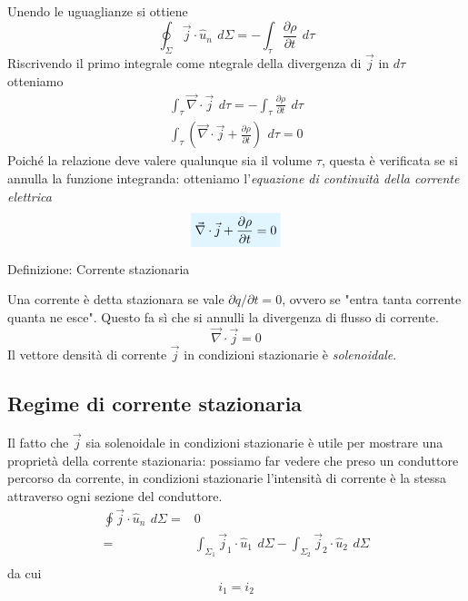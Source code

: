 \documentclass[x11names]{report}
\newcommand{\definizione}[2]{
	\begin{center}
		\fboxsep11pt
		\colorbox{myblue}{\begin{minipage}{5.75in}
				\begin{blues}{Definizione: #1}
					#2
				\end{blues}
		\end{minipage}}
	\end{center}
}
\newcommand{\viola}[1]{%
	\colorbox{myblue}{$\displaystyle #1$}
}
\begin{document}
Unendo le uguaglianze si ottiene
\[
\oint_{\Sigma} \vec{j}\cdot \hat{u}_n \,\ d\Sigma = -\int_\tau \frac{\partial\rho}{\partial t} \,\ d\tau
\]
Riscrivendo il primo integrale come ntegrale della divergenza di \(\vec{j}\) in \(d\tau\) otteniamo
\begin{gather}
	\int_\tau \vec{\nabla} \cdot \vec{j} \,\ d\tau = - \int_\tau \frac{\partial\rho}{\partial t} \,\ d\tau \\
	\int_\tau \left(\vec{\nabla} \cdot \vec{j} + \frac{\partial\rho}{\partial t}\right)\,\ d\tau = 0
\end{gather}
Poiché la relazione deve valere qualunque sia il volume \(\tau\), questa è verificata se si annulla la funzione integranda: otteniamo l'\textit{equazione di continuità della corrente elettrica}
\begin{equation}
	\viola{\vec{\nabla} \cdot \vec{j} + \frac{\partial\rho}{\partial t} = 0}
\end{equation}
\definizione{Corrente stazionaria}{
Una corrente è detta stazionara se vale \(\partial q/\partial t = 0\), ovvero se "entra tanta corrente quanta ne esce". Questo fa sì che si annulli la divergenza di flusso di corrente.
\begin{equation}
	\vec{\nabla} \cdot \vec{j} = 0
\end{equation}
Il vettore densità di corrente \(\vec{j}\) in condizioni stazionarie è \textit{solenoidale}.
}
\subsection{Regime di corrente stazionaria}
Il fatto che \(\vec{j}\) sia solenoidale in condizioni stazionarie è utile per mostrare una proprietà della corrente stazionaria: possiamo far vedere che preso un conduttore percorso da corrente, in condizioni stazionarie l'intensità di corrente è la stessa attraverso ogni sezione del conduttore.
\begin{align*}
	\oint \vec{j}\cdot \hat{u}_n \,\ d\Sigma =& 0 \\
	=& \int_{\Sigma_1}\vec{j}_1\cdot \hat{u}_1 \,\ d\Sigma - \int_{\Sigma_2}\vec{j}_2\cdot \hat{u}_2 \,\ d\Sigma \\
\end{align*}
da cui
\[
i_1 = i_2
\]
\end{document}
